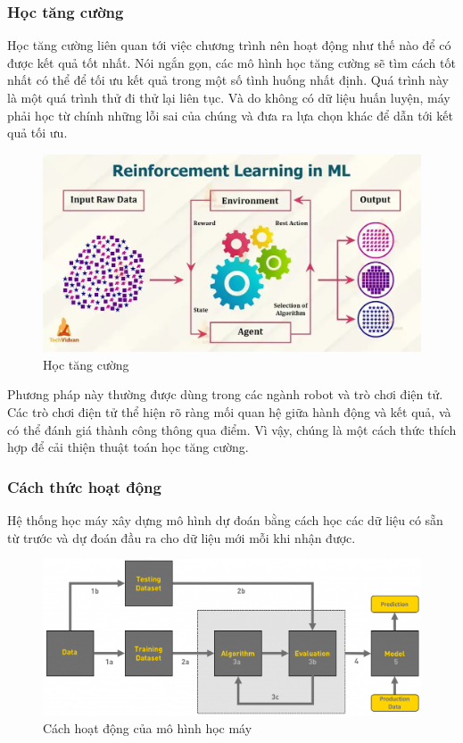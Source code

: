 \subsubsection{Học tăng cường}
Học tăng cường liên quan tới việc chương trình nên hoạt động như thế nào để có được kết quả tốt nhất. Nói ngắn gọn, các mô hình học tăng cường sẽ tìm cách tốt nhất có thể để tối ưu kết quả trong một số tình huống nhất định. Quá trình này là một quá trình thử đi thử lại liên tục. Và do không có dữ liệu huấn luyện, máy phải học từ chính những lỗi sai của chúng và đưa ra lựa chọn khác để dẫn tới kết quả tối ưu.
\begin{figure}[htb]
    \centering
    \includegraphics[width=\textwidth]{image/reinforcement-learning.jpg}
    \caption{Học tăng cường}
    \label{figure:reinforcement-learning}
\end{figure}

Phương pháp này thường được dùng trong các ngành robot và trò chơi điện tử. Các trò chơi điện tử thể hiện rõ ràng mối quan hệ giữa hành động và kết quả, và có thể đánh giá thành công thông qua điểm. Vì vậy, chúng là một cách thức thích hợp để cải thiện thuật toán học tăng cường.

\subsubsection{Cách thức hoạt động}
Hệ thống học máy xây dựng mô hình dự đoán bằng cách học các dữ liệu có sẵn từ trước và dự đoán đầu ra cho dữ liệu mới mỗi khi nhận được.
\begin{figure}[htb]
    \centering
    \includegraphics[width=\textwidth]{image/machine-learning-model.png}
    \caption{Cách hoạt động của mô hình học máy}
    \label{figure:machine-learning-model}
\end{figure}

